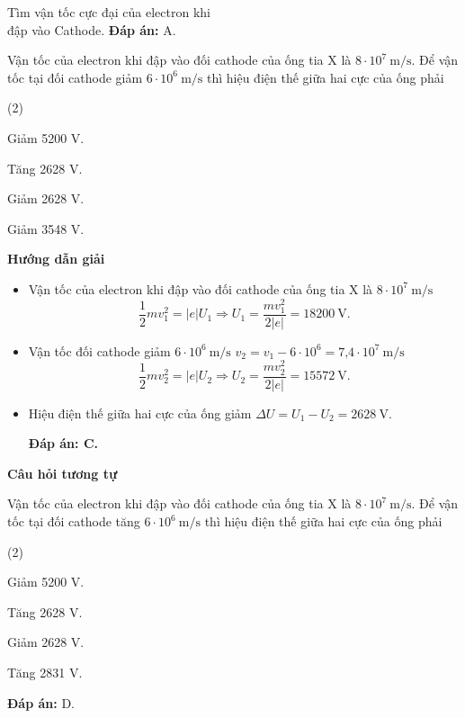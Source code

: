 \begin{dang}{Tìm vận tốc cực đại của electron khi\\ đập vào Cathode.}
{\textbf{Đáp án:} A.
}

{Vận tốc của electron khi đập vào đối cathode của ống tia X là $8\cdot 10^7 \ \text{m/s}$. Để vận tốc tại đối cathode  giảm $6\cdot 10^6\ \text{m/s}$ thì hiệu điện thế giữa hai cực của ống phải 
\begin{mcq}(2)
	\item Giảm 5200 V.
	\item Tăng 2628 V.
	\item Giảm 2628 V.
	\item Giảm 3548 V.
\end{mcq}
}
{\begin{center}
	\textbf{Hướng dẫn giải}
\end{center}
\begin{itemize}
	\item Vận tốc của electron khi đập vào đối cathode của ống tia X là $8 \cdot 10^7 \ \text{m/s}$
	\begin{equation*}
		\dfrac{1}{2}mv^2_1 =|e| U_1 \Rightarrow U_1=\dfrac{mv^2_1}{2|e|}=18200\ \text{V}.
	\end{equation*}
	\item Vận tốc đối cathode giảm $6 \cdot 10^6\ \text{m/s}$ $v_2=v_1 - 6 \cdot 10^6 = \text{7,4}\cdot 10^7\ \text{m/s}$
	\begin{equation*}
		\dfrac{1}{2}mv^2_2 =|e| U_2 \Rightarrow U_2=\dfrac{mv^2_2}{2|e|}=15572\ \text{V}.
	\end{equation*}
	\item Hiệu điện thế giữa hai cực của ống giảm $\Delta U = U_1 - U_2 =2628\ \text{V}$.
	
	\textbf{Đáp án: C.}
\end{itemize}

\begin{center}
\textbf{Câu hỏi tương tự}
\end{center}

Vận tốc của electron khi đập vào đối cathode của ống tia X là $8\cdot 10^7 \ \text{m/s}$. Để vận tốc tại đối cathode  tăng $6\cdot 10^6\ \text{m/s}$ thì hiệu điện thế giữa hai cực của ống phải 
\begin{mcq}(2)
	\item Giảm 5200 V.
	\item Tăng 2628 V.
	\item Giảm 2628 V.
	\item Tăng 2831 V.
\end{mcq}

\textbf{Đáp án:} D.

}

\end{dang}


